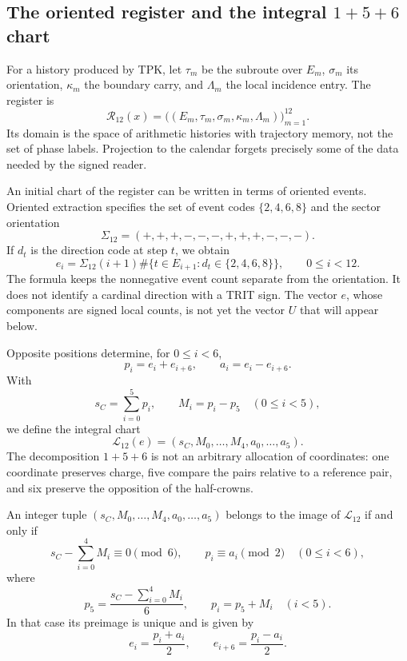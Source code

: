 \subsection{The oriented register and the integral \texorpdfstring{\(1+5+6\)}{1+5+6} chart}
\label{subsec:k-registro-integral}

For a history produced by TPK, let \(\tau_m\) be the subroute over
\(E_m\), \(\sigma_m\) its orientation, \(\kappa_m\) the boundary
carry, and \(\Lambda_m\) the local incidence entry. The register is
\[
 \mathcal R_{12}(x)=
 \bigl((E_m,\tau_m,\sigma_m,\kappa_m,\Lambda_m)\bigr)_{m=1}^{12}.
\]
Its domain is the space of arithmetic histories with trajectory memory, not the set of
phase labels. Projection to the calendar forgets precisely some
of the data needed by the signed reader.

An initial chart of the register can be written in terms of oriented
events. Oriented extraction specifies the set of event codes
\(\{2,4,6,8\}\) and the sector orientation
\[
 \Sigma_{12}=(+,+,+,-,-,-,+,+,+,-,-,-).
\]
If \(d_t\) is the direction code at step \(t\), we obtain
\[
 e_i=\Sigma_{12}(i+1)
 \#\{t\in E_{i+1}:d_t\in\{2,4,6,8\}\},
 \qquad0\leq i<12.
\]
The formula keeps the nonnegative event count separate from the
orientation. It does not identify a cardinal direction with a TRIT sign. The
vector \(e\), whose components are signed local counts, is not
yet the vector \(U\) that will appear below.

Opposite positions determine, for \(0\leq i<6\),
\[
 p_i=e_i+e_{i+6},\qquad a_i=e_i-e_{i+6}.
\]
With
\[
 s_C=\sum_{i=0}^{5}p_i,\qquad M_i=p_i-p_5\quad(0\leq i<5),
\]
we define the integral chart
\[
 \mathcal L_{12}(e)
 =(s_C,M_0,\ldots,M_4,a_0,\ldots,a_5).
\]
The decomposition \(1+5+6\) is not an arbitrary allocation of coordinates:
one coordinate preserves charge, five compare the pairs relative to a
reference pair, and six preserve the opposition of the half-crowns.

\begin{lemma}
\label{lem:k-carta-integral}
An integer tuple \((s_C,M_0,\ldots,M_4,a_0,\ldots,a_5)\) belongs to the
image of \(\mathcal L_{12}\) if and only if
\[
 s_C-\sum_{i=0}^{4}M_i\equiv0\pmod6,
 \qquad p_i\equiv a_i\pmod2\quad(0\leq i<6),
\]
where
\[
 p_5=\frac{s_C-\sum_{i=0}^{4}M_i}{6},\qquad p_i=p_5+M_i\quad(i<5).
\]
In that case its preimage is unique and is given by
\[
 e_i=\frac{p_i+a_i}{2},\qquad e_{i+6}=\frac{p_i-a_i}{2}.
\]
\end{lemma}

